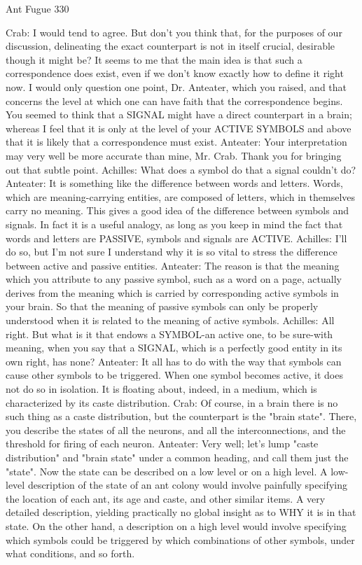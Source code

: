 Ant Fugue                                                                                 330

Crab: I would tend to agree. But don't you think that, for the purposes of our discussion,
   delineating the exact counterpart is not in itself crucial, desirable though it might be?
   It seems to me that the main idea is that such a correspondence does exist, even if we
   don't know exactly how to define it right now. I would only question one point, Dr.
   Anteater, which you raised, and that concerns the level at which one can have faith
   that the correspondence begins. You seemed to think that a SIGNAL might have a
   direct counterpart in a brain; whereas I feel that it is only at the level of your
   ACTIVE SYMBOLS and above that it is likely that a correspondence must exist.
Anteater: Your interpretation may very well be more accurate than mine, Mr. Crab.
   Thank you for bringing out that subtle point.
Achilles: What does a symbol do that a signal couldn't do?
Anteater: It is something like the difference between words and letters. Words, which are
   meaning-carrying entities, are composed of letters, which in themselves carry no
   meaning. This gives a good idea of the difference between symbols and signals. In
   fact it is a useful analogy, as long as you keep in mind the fact that words and letters
   are PASSIVE, symbols and signals are ACTIVE.
Achilles: I'll do so, but I'm not sure I understand why it is so vital to stress the difference
   between active and passive entities.
Anteater: The reason is that the meaning which you attribute to any passive symbol, such
   as a word on a page, actually derives from the meaning which is carried by
   corresponding active symbols in your brain. So that the meaning of passive symbols
   can only be properly understood when it is related to the meaning of active symbols.
Achilles: All right. But what is it that endows a SYMBOL-an active one, to be sure-with
   meaning, when you say that a SIGNAL, which is a perfectly good entity in its own
   right, has none? Anteater: It all has to do with the way that symbols can cause other
   symbols to be triggered. When one symbol becomes active, it does not do so in
   isolation. It is floating about, indeed, in a medium, which is characterized by its caste
   distribution.
Crab: Of course, in a brain there is no such thing as a caste distribution, but the
   counterpart is the "brain state". There, you describe the states of all the neurons, and
   all the interconnections, and the threshold for firing of each neuron.
Anteater: Very well; let's lump "caste distribution" and "brain state" under a common
   heading, and call them just the "state". Now the state can be described on a low level
   or on a high level. A low-level description of the state of an ant colony would involve
   painfully specifying the location of each ant, its age and caste, and other similar
   items. A very detailed description, yielding practically no global insight as to WHY it
   is in that state. On the other hand, a description on a high level would involve
   specifying which symbols could be triggered by which combinations of other
   symbols, under what conditions, and so forth.




